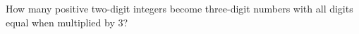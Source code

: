 How many positive two-digit integers become three-digit numbers with all digits equal when multiplied by $3$?
